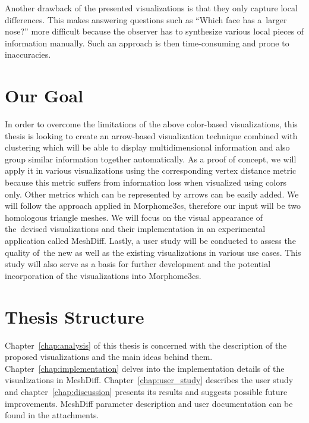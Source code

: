 
Another drawback of the presented visualizations is that they only capture local differences. This makes answering questions such as ``Which face has a~larger nose?'' more difficult because the observer has to synthesize various local pieces of information manually. Such an approach is then time-consuming and prone to inaccuracies.
\section*{Our Goal}

In order to overcome the limitations of the above color-based visualizations, this thesis is looking to create an arrow-based visualization technique combined with clustering which will be able to display multidimensional information and also group similar information together automatically. As a proof of concept, we will apply it in various visualizations using the corresponding vertex distance metric because this metric suffers from information loss when visualized using colors only. Other metrics which can be represented by arrows can be easily added. We will follow the approach applied in Morphome3cs, therefore our input will be two homologous triangle meshes. We will focus on the visual appearance of the~devised visualizations and their implementation in an experimental application called MeshDiff. Lastly, a user study will be conducted to assess the quality of~the new as well as the existing visualizations in various use cases. This study will also serve as a basis for further development and the potential incorporation of the visualizations into Morphome3cs.
\section*{Thesis Structure}

Chapter~\ref{chap:analysis} of this thesis is concerned with the description of the proposed visualizations and the main ideas behind them. Chapter~\ref{chap:implementation} delves into the implementation details of the visualizations in MeshDiff. Chapter~\ref{chap:user_study} describes the user study and chapter~\ref{chap:discussion} presents its results and suggests possible future improvements. MeshDiff parameter description and user documentation can be found in the attachments.